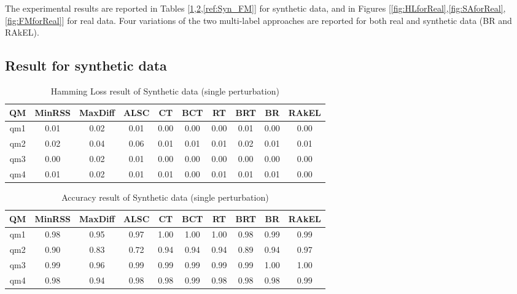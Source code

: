 \documentclass[12pt]{article}
\begin{document}
The experimental results are reported in Tables [\ref{ref:Syn_HL},\ref{ref:Syn_SA},\ref{ref:Syn_FM}] for synthetic data, and in  Figures [\ref{fig:HLforReal},\ref{fig:SAforReal},\ref{fig:FMforReal}] for real data. Four variations of the two multi-label approaches are reported for both real and synthetic data (BR and RAkEL).
\subsection{Result for synthetic data}



\begin {table}[h]
\scriptsize
\centering
\begin{tabular}{c|c|c|c|c|c|c|c|c|c}	
	\hline\hline	
	
	

	
QM  &  MinRSS  &  MaxDiff  &  ALSC  &  CT  &  BCT  &  RT  &  BRT  &  BR  &  RAkEL \\ \hline
qm1  & 0.01 & 0.02 & 0.01 & 0.00 & 0.00 & 0.00 & 0.01 & 0.00 & 0.00 \\
qm2  & 0.02 & 0.04 & 0.06 & 0.01 & 0.01 & 0.01 & 0.02 & 0.01 & 0.01 \\
qm3  & 0.00 & 0.02 & 0.01 & 0.00 & 0.00 & 0.00 & 0.00 & 0.00 & 0.00 \\
qm4  & 0.01 & 0.02 & 0.01 & 0.01 & 0.00 & 0.01 & 0.01 & 0.01 & 0.00 \\
 \hline\hline
\end{tabular}
\caption {Hamming Loss result of Synthetic data (single perturbation)} \label{ref:Syn_HL} 
\end{table}




\begin {table}[h]
\scriptsize
\centering
\begin{tabular}{c|c|c|c|c|c|c|c|c|c}	
	\hline\hline	
QM & MinRSS & MaxDiff & ALSC & CT & BCT & RT & BRT & BR & RAkEL \\ \hline
qm1 & 0.98 & 0.95 & 0.97 & 1.00 & 1.00 & 1.00 & 0.98 & 0.99 & 0.99 \\
qm2 &0.90 & 0.83 &0.72 & 0.94 & 0.94 & 0.94 & 0.89 & 0.94 & 0.97 \\
qm3 & 0.99 & 0.96 & 0.99 & 0.99 & 0.99 & 0.99 & 0.99 & 1.00 & 1.00  \\
qm4 & 0.98 & 0.94 & 0.98 & 0.98 & 0.99 & 0.98 & 0.98 & 0.98 & 0.99	\\ 
\hline\hline
\end{tabular}
\caption {Accuracy result of Synthetic data (single perturbation)} \label{ref:Syn_SA} 
\end{table}
\end{document}
